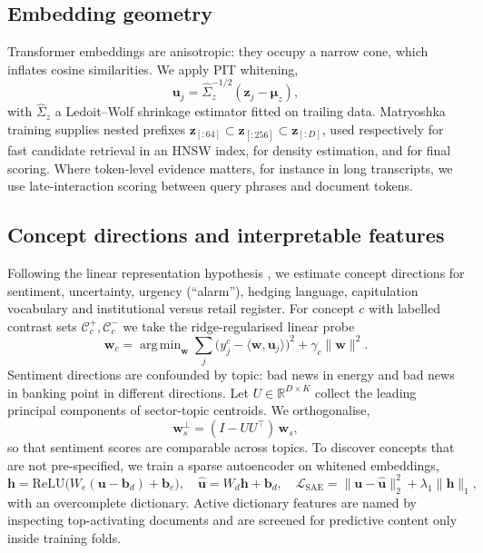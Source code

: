 \documentclass[11pt,a4paper]{article}
\theoremstyle{plain}
\theoremstyle{definition}
\theoremstyle{remark}
\newcommand{\R}{\mathbb{R}}
\newcommand{\z}{\bm{z}}
\newcommand{\w}{\bm{w}}
\DeclareMathOperator*{\argmin}{arg\,min}
\begin{document}
\subsection{Embedding geometry}
Transformer embeddings are anisotropic: they occupy a narrow cone, which inflates cosine similarities. We apply PIT whitening,
\begin{equation}
  \bm u_j = \hat\Sigma_{z}^{-1/2}(\z_j-\hat{\bm\mu}_z),
\end{equation}
with $\hat\Sigma_z$ a Ledoit--Wolf shrinkage estimator \citep{ledoit2004} fitted on trailing data. Matryoshka training \citep{kusupati2022} supplies nested prefixes $\z_{[:64]}\subset\z_{[:256]}\subset\z_{[:D]}$, used respectively for fast candidate retrieval in an HNSW index, for density estimation, and for final scoring. Where token-level evidence matters, for instance in long transcripts, we use late-interaction scoring \citep{khattab2020} between query phrases and document tokens.

\subsection{Concept directions and interpretable features}
Following the linear representation hypothesis \citep{park2023}, we estimate concept directions for sentiment, uncertainty, urgency (``alarm''), hedging language, capitulation vocabulary and institutional versus retail register. For concept $c$ with labelled contrast sets $\mathcal{C}^+_c,\mathcal{C}^-_c$ we take the ridge-regularised linear probe
\begin{equation}
  \w_c = \argmin_{\w}\sum_{j}\big(y^{c}_j-\langle\w,\bm u_j\rangle\big)^2+\gamma_c\|\w\|^2 .
\end{equation}
Sentiment directions are confounded by topic: bad news in energy and bad news in banking point in different directions. Let $U\in\R^{D\times K}$ collect the leading principal components of sector-topic centroids. We orthogonalise,
\begin{equation}
  \w_s^\perp = (I-UU^\top)\,\w_s,
\end{equation}
so that sentiment scores are comparable across topics. To discover concepts that are not pre-specified, we train a sparse autoencoder \citep{cunningham2023,bricken2023} on whitened embeddings,
\begin{equation}
  \bm h=\mathrm{ReLU}\big(W_e(\bm u-\bm b_d)+\bm b_e\big),\quad
  \hat{\bm u}=W_d\bm h+\bm b_d,\quad
  \mathcal{L}_{\mathrm{SAE}}=\|\bm u-\hat{\bm u}\|_2^2+\lambda_1\|\bm h\|_1,
\end{equation}
with an overcomplete dictionary. Active dictionary features are named by inspecting top-activating documents and are screened for predictive content only inside training folds.
\end{document}
